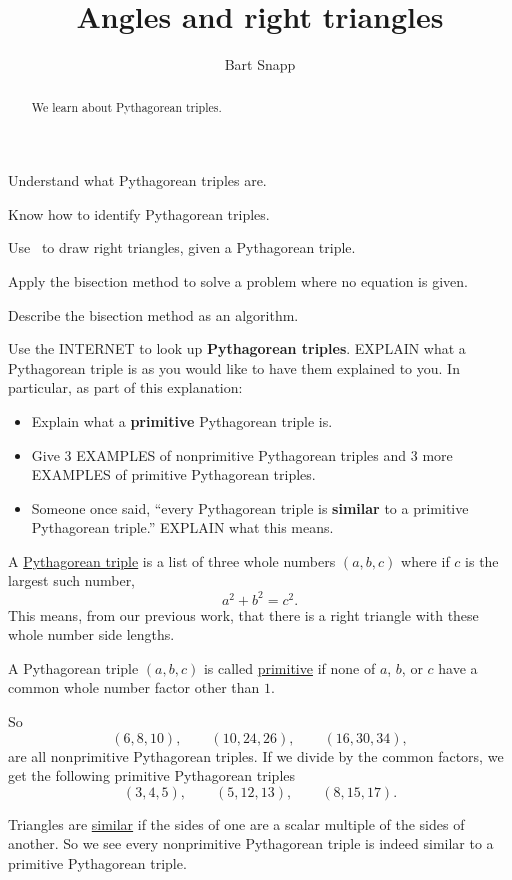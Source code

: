 \documentclass[noauthor,nooutcomes,handout,12pt]{ximera}
\title{Angles and right triangles}
\author{Bart Snapp}
\begin{document}
\begin{abstract}
  We learn about Pythagorean triples.
\end{abstract}
\maketitle

\begin{listOutcomes}
\item{Understand what Pythagorean triples are.}
\item{Know how to identify Pythagorean triples.}
\item{Use \snap\ to draw right triangles, given a Pythagorean triple.}
\item{Apply the bisection method to solve a problem where no equation is given.}
\item{Describe the bisection method as an algorithm.}
\end{listOutcomes}
\mynewpage

\begin{question}
  Use the INTERNET to look up \textbf{Pythagorean triples}. EXPLAIN
  what a Pythagorean triple is as you would like to have them
  explained to you. In particular, as part of this explanation:
  \begin{itemize}
    \item Explain what a \textbf{primitive} Pythagorean triple is.
    \item Give $3$ EXAMPLES of nonprimitive Pythagorean triples and
      $3$ more EXAMPLES of primitive Pythagorean triples.
    \item Someone once said, ``every Pythagorean triple is
      \textbf{similar} to a primitive Pythagorean triple.'' EXPLAIN
      what this means.
  \end{itemize}
  \begin{freeResponse}
    A \underline{Pythagorean triple} is a list of three whole numbers
    $(a,b,c)$ where if $c$ is the largest such number,
    \[
    a^2 + b^2 = c^2.
    \]
    This means, from our previous work, that there is a right triangle
    with these whole number side lengths.

    
    A Pythagorean triple $(a,b,c)$ is called \underline{primitive} if
    none of $a$, $b$, or $c$ have a common whole number factor other
    than $1$.
    
    So
    \[
    (6,8,10), \qquad (10,24,26), \qquad (16,30,34), 
    \]
    are all nonprimitive Pythagorean triples. If we divide by the
    common factors, we get the following primitive Pythagorean
    triples
    \[
    (3,4,5), \qquad (5,12,13), \qquad (8,15,17).
    \]

    Triangles are \underline{similar} if the sides of one are a scalar
    multiple of the sides of another. So we see every nonprimitive
    Pythagorean triple is indeed similar to a primitive Pythagorean
    triple.
  \end{freeResponse}
\end{question}
\mynewpage
\end{document}

